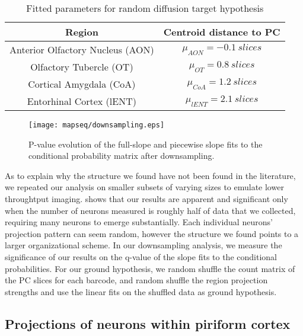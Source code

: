 \documentclass[../dissertation.tex]{subfiles}
\begin{document}
\begin{table}
    \centering
    \begin{tabular}{cc}
        \toprule
        \textbf{Region}                     & \textbf{Centroid distance to PC}      \\
        \midrule
        Anterior Olfactory Nucleus (AON)    & $\mu_{AON}  = \SI{-0.1}{slices}$    \\
        Olfactory Tubercle (OT)             & $\mu_{OT}   = \SI{ 0.8}{slices}$    \\
        Cortical Amygdala (CoA)             & $\mu_{CoA}  = \SI{ 1.2}{slices}$    \\
        Entorhinal Cortex (lENT)            & $\mu_{lENT} = \SI{ 2.1}{slices}$    \\
        \bottomrule
    \end{tabular}
    \caption{Fitted parameters for random diffusion target hypothesis}
    \label{tab:mapseq-difRes}
\end{table}

\begin{figure}[ht]
    \centering
    \texttt{[image: mapseq/downsampling.eps]}
    \caption{P-value evolution of the full-slope and piecewise slope fits to the conditional probability matrix after downsampling.}
    \label{fig:downsampling}
\end{figure}

As to explain why the structure we found have not been found in the literature, we repeated our analysis on smaller subsets of varying sizes to emulate lower throughtput imaging.
 shows that our results are apparent and significant only when the number of neurons measured is roughly half of data that we collected, requiring many neurons to emerge substantially.
Each individual neurons' projection pattern can seem random, however the structure we found points to a larger organizational scheme.
In our downsampling analysis, we measure the significance of our results on the q-value of the slope fits to the conditional probabilities.
For our ground hypothesis, we random shuffle the count matrix of the PC slices for each barcode, and random shuffle the region projection strengths and use the linear fits on the shuffled data as ground hypothesis.

\subsection{Projections of neurons within piriform cortex}
\end{document}
